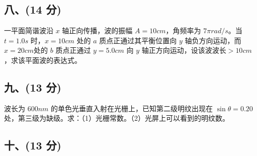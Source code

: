\subsection{八、(14 分)}
一平面简谐波沿 $x$ 轴正向传播，波的振幅 $A=10cm$，角频率为 $7\pi rad/s$。当
$t=1.0s$ 时，$x=10cm$ 处的 $a$ 质点正通过其平衡位置向 $y$ 轴负方向运动，而 $x=20cm$处的 $b$ 质点正通过 $y=5.0cm$ 向 $y$ 轴正方向运动，设该波波长$>10cm$，求该平面波的表达式。
\subsection{九、(13 分)}
波长为 $600nm$ 的单色光垂直入射在光栅上，已知第二级明纹出现在 $\sin \theta=0.20$ 处，第三级为缺级。求：（1）光栅常数。（2）光屏上可以看到的明纹数。
\subsection{十、(13 分)}